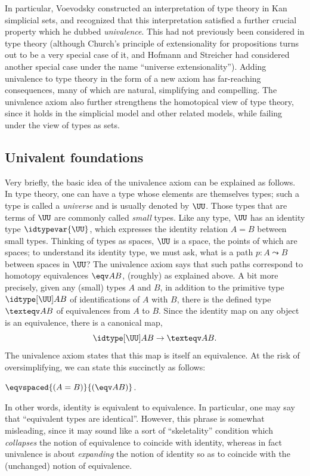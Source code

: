 In particular, Voevodsky constructed an interpretation of type theory in Kan simplicial sets, and recognized that this interpretation satisfied a further crucial property which he dubbed \emph{univalence}.
This had not previously been considered in type theory (although Church's principle of extensionality for propositions turns out to be a very special case of it, and Hofmann and Streicher had considered another special case under the name ``universe extensionality'').
Adding univalence to type theory in the form of a new axiom has far-reaching consequences, many of which are natural, simplifying and compelling.
The univalence axiom also further strengthens the homotopical view of type theory, since it holds in the simplicial model and other related models, while failing under the view of types as sets.

\subsection*{Univalent foundations}

Very briefly, the basic idea of the univalence axiom can be explained as follows.
In type theory, one can have a type whose elements are themselves types; such a type is called a \emph{universe} and is usually denoted by $\UU$.
Those types that are terms of $\UU$ are commonly called \emph{small} types.
%
%
Like any type, $\UU$ has an identity type $\idtypevar{\UU}$, which expresses the identity relation $A = B$ between small types.
Thinking of types as spaces, $\UU$ is a space, the points of which are spaces; to understand its identity type, we must ask, what is a path $p : A \leadsto B$ between spaces in $\UU$?
The univalence axiom says that such paths correspond to homotopy equivalences $\eqv A B$, (roughly) as explained above.
A bit more precisely, given any (small) types $A$ and $B$, in addition to the primitive type $\idtype[\UU]AB$ of identifications of $A$ with $B$, there is the defined type $\texteqv AB$ of equivalences from $A$ to $B$.
Since the identity map on any object is an equivalence, there is a canonical map,
\[\idtype[\UU]AB\to\texteqv AB.\]
The univalence axiom states that this map is itself an equivalence.
At the risk of oversimplifying, we can state this succinctly as follows:

\begin{description}%
\item[Univalence Axiom:]  $\eqvspaced{(A = B)}{(\eqv A B)}$.
\end{description}
%
In other words, identity is equivalent to equivalence. %
In particular, one may say that ``equivalent types are identical''.
However, this phrase is somewhat misleading, since it may sound like a sort of ``skeletality'' condition which \emph{collapses} the notion of equivalence to coincide with identity, whereas in fact univalence is about \emph{expanding} the notion of identity so as to coincide with the (unchanged) notion of equivalence.

